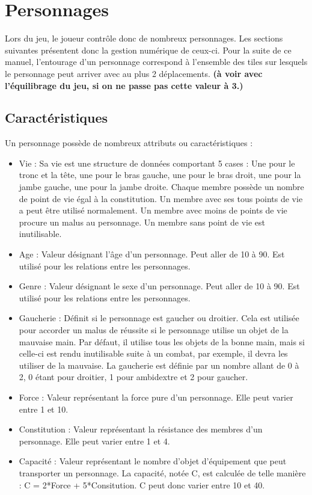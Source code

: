 \section{Personnages}
Lors du jeu, le joueur contrôle donc de nombreux personnages. Les sections suivantes présentent donc la gestion numérique de ceux-ci. Pour la suite de ce manuel, l'entourage d'un personnage correspond à l'ensemble des tiles sur lesquels le personnage peut arriver avec au plus 2 déplacements. \textbf{(à voir avec l'équilibrage du jeu, si on ne passe pas cette valeur à 3.)}
\subsection{Caractéristiques}
Un personnage possède de nombreux attributs ou caractéristiques :
\begin{itemize}
  \item Vie : Sa vie est une structure de données comportant 5 cases : Une pour le tronc et la tête, une pour le bras gauche, une pour le bras droit, une pour la jambe gauche, une pour la jambe droite. Chaque membre possède un nombre de point de vie égal à la constitution. Un membre avec ses tous points de vie a peut être utilisé normalement. Un membre avec moins de points de vie procure un malus au personnage. Un membre sans point de vie est inutilisable.
  \item Age : Valeur désignant l'âge d'un personnage. Peut aller de 10 à 90. Est utilisé pour les relations entre les personnages.
  \item Genre : Valeur désignant le sexe d'un personnage. Peut aller de 10 à 90. Est utilisé pour les relations entre les personnages.
  \item Gaucherie : Définit si le personnage est gaucher ou droitier. Cela est utilisée pour accorder un malus de réussite si le personnage utilise un objet de la mauvaise main. Par défaut, il utilise tous les objets de la bonne main, mais si celle-ci est rendu inutilisable suite à un combat, par exemple, il devra les utiliser de la mauvaise. La gaucherie est définie par un nombre allant de 0 à 2, 0 étant pour droitier, 1 pour ambidextre et 2 pour gaucher.
  \item Force : Valeur représentant la force pure d'un personnage. Elle peut varier entre 1 et 10.
  \item Constitution : Valeur représentant la résistance des membres d'un personnage. Elle peut varier entre 1 et 4.
  \item Capacité : Valeur représentant le nombre d'objet d'équipement que peut transporter un personnage. La capacité, notée C, est calculée de telle manière : C = 2*Force +  5*Consitution. C peut donc varier entre 10 et 40.

\end{itemize}
